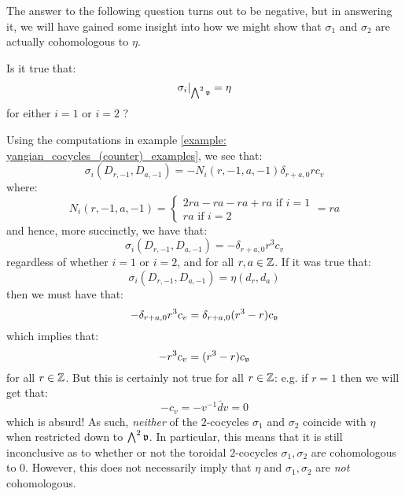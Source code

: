         The answer to the following question turns out to be negative, but in answering it, we will have gained some insight into how we might show that $\sigma_1$ and $\sigma_2$ are actually cohomologous to $\eta$.
        \begin{question}
            Is it true that:
                $$\sigma_i|_{ \bigwedge^2 \mathfrak{v} } = \eta$$
            for either $i = 1$ or $i = 2$ ?
        \end{question}
        Using the computations in example \ref{example: yangian_cocycles_(counter)_examples}, we see that:
            $$\sigma_i(D_{r, -1}, D_{a, -1}) = -N_i(r, -1, a, -1) \delta_{r + a, 0} r c_v$$
        where:
            $$
                N_i(r, -1, a, -1) =
                \begin{cases}
                    \text{$2 ra - ra - ra + ra$ if $i = 1$}
                    \\
                    \text{$ra$ if $i = 2$}
                \end{cases}
                = ra
            $$
        and hence, more succinctly, we have that:
            $$\sigma_i(D_{r, -1}, D_{a, -1}) = -\delta_{r + a, 0} r^3 c_v$$
        regardless of whether $i = 1$ or $i = 2$, and for all $r, a \in \mathbb{Z}$. If it was true that:
            $$\sigma_i(D_{r, -1}, D_{a, -1}) = \eta(d_r, d_a)$$
        then we must have that:
            $$-\delta_{r + a, 0} r^3 c_v = \delta_{r + a, 0} (r^3 - r) c_{\mathfrak{v}}$$
        which implies that:
            $$-r^3 c_v = (r^3 - r) c_{\mathfrak{v}}$$
        for all $r \in \mathbb{Z}$. But this is certainly not true for all $r \in \mathbb{Z}$: e.g. if $r = 1$ then we will get that:
            $$-c_v = -v^{-1} \bar{d}v = 0$$
        which is absurd! As such, \textit{neither} of the $2$-cocycles $\sigma_1$ and $\sigma_2$ coincide with $\eta$ when restricted down to $\bigwedge^2 \mathfrak{v}$. In particular, this means that it is still inconclusive as to whether or not the toroidal $2$-cocycles $\sigma_1, \sigma_2$ are cohomologous to $0$. However, this does not necessarily imply that $\eta$ and $\sigma_1, \sigma_2$ are \textit{not} cohomologous. 

